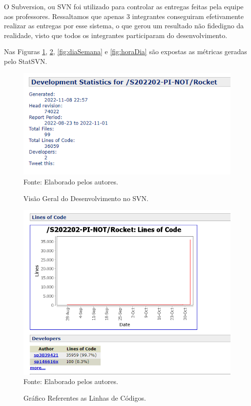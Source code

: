 \documentclass[
    12pt,               %
    openright,          %
    oneside,
    a4paper,            %
    BIBLATEX,           %
    TODO,               %
    english,            %
    brazil              %
    ]{ifsp-spo-inf-ctds}
\begin{document}
        O Subversion, ou SVN foi utilizado para controlar as entregas feitas pela equipe aos professores. Ressaltamos que apenas 3 integrantes conseguiram efetivamente realizar as entregas por esse sistema, o que gerou um resultado não fidedigno da realidade, visto que todos os integrantes participaram do desenvolvimento. 
    
        Nas Figuras \ref{fig:desenvolvimentoSVN}, \ref{fig:linhaCod}, \ref{fig:diaSemana} e \ref{fig:horaDia} são expostas as métricas geradas pelo StatSVN.

    \begin{figure}[H]
                \centering
                \caption{Visão Geral do Desenvolvimento no SVN.}
                \includegraphics[width=1 \textwidth]{StatSVN/StatDesenvolvimento.png}
                {\footnotesize Fonte: Elaborado pelos autores.}
                \label{fig:desenvolvimentoSVN}
            \end{figure}
    
    \begin{figure}[H]
                \centering
                \caption{Gráfico Referentes as Linhas de Códigos.}
                \includegraphics[width=1 \textwidth]{StatSVN/linha de codigo autor.png}
                {\footnotesize Fonte: Elaborado pelos autores.}
                \label{fig:linhaCod}
            \end{figure}
    
\end{document}
